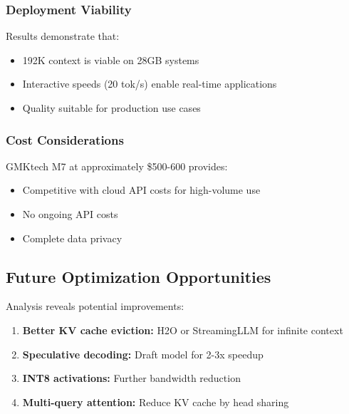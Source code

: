 \subsubsection{Deployment Viability}

Results demonstrate that:

\begin{itemize}
    \item 192K context is viable on 28GB systems
    \item Interactive speeds (20 tok/s) enable real-time applications
    \item Quality suitable for production use cases
\end{itemize}

\subsubsection{Cost Considerations}

GMKtech M7 at approximately \$500-600 provides:

\begin{itemize}
    \item Competitive with cloud API costs for high-volume use
    \item No ongoing API costs
    \item Complete data privacy
\end{itemize}

\subsection{Future Optimization Opportunities}

Analysis reveals potential improvements:

\begin{enumerate}
    \item \textbf{Better KV cache eviction:} H2O or StreamingLLM for infinite context
    \item \textbf{Speculative decoding:} Draft model for 2-3x speedup
    \item \textbf{INT8 activations:} Further bandwidth reduction
    \item \textbf{Multi-query attention:} Reduce KV cache by head sharing
\end{enumerate}
